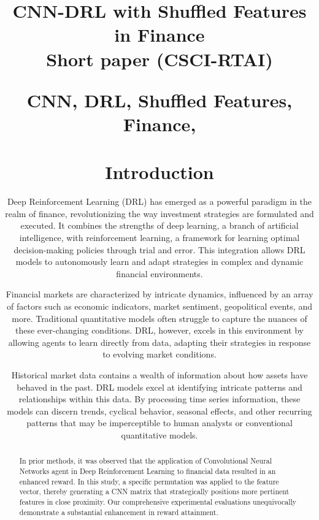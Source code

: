 
\title{CNN-DRL with Shuffled Features in Finance\\
{\footnotesize Short paper (CSCI-RTAI)}
\maketitle

\begin{abstract}
In prior methods, it was observed that the application of Convolutional Neural Networks agent in Deep Reinforcement Learning to financial data resulted in an enhanced reward.\cite{montazeri2023scnnFinrl} In this study, a specific permutation was applied to the feature vector, thereby generating a CNN matrix that strategically positions more pertinent features in close proximity. Our comprehensive experimental evaluations unequivocally demonstrate a substantial enhancement in reward attainment.


\end{abstract}

\begin{IEEEkeywords}
CNN, DRL, Shuffled Features, Finance,
\end{IEEEkeywords}

\section{Introduction}
Deep Reinforcement Learning (DRL) has emerged as a powerful paradigm in the realm of finance, revolutionizing the way investment strategies are formulated and executed. It combines the strengths of deep learning, a branch of artificial intelligence, with reinforcement learning, a framework for learning optimal decision-making policies through trial and error. This integration allows DRL models to autonomously learn and adapt strategies in complex and dynamic financial environments.

Financial markets are characterized by intricate dynamics, influenced by an array of factors such as economic indicators, market sentiment, geopolitical events, and more. Traditional quantitative models often struggle to capture the nuances of these ever-changing conditions. DRL, however, excels in this environment by allowing agents to learn directly from data, adapting their strategies in response to evolving market conditions.

Historical market data contains a wealth of information about how assets have behaved in the past. DRL models excel at identifying intricate patterns and relationships within this data. By processing time series information, these models can discern trends, cyclical behavior, seasonal effects, and other recurring patterns that may be imperceptible to human analysts or conventional quantitative models.

}
